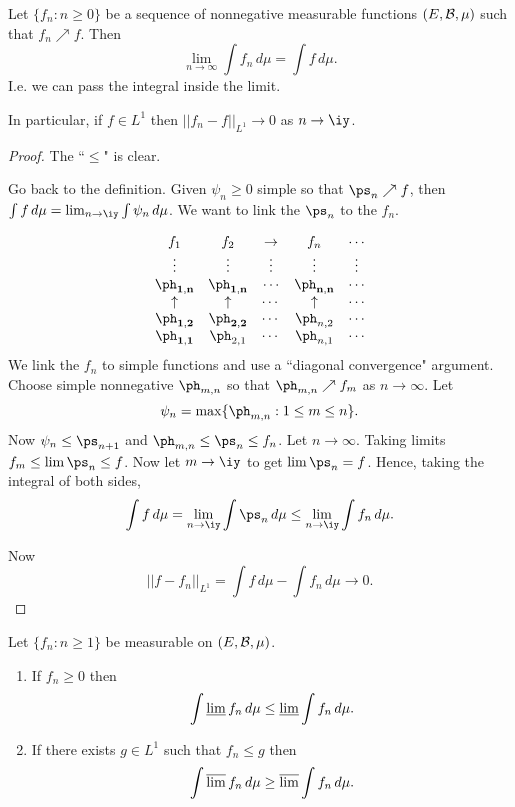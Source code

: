 \begin{thm}
Let $\{f_n:n\geq 0\}$ be a sequence of nonnegative measurable functions $(E,\cal B,\mu)$ such that $f_n\nearrow f$. Then
\[
\lim_{n\to \infty}\int f_n\,d\mu=\int f\,d\mu.
\] 
I.e. we can pass the integral inside the limit.

In particular, if $f\in L^1$ then $||f_n-f||_{L^1}\to 0$ as $n\to \iy$.
\end{thm}
\begin{proof}
The ``$\le$" is clear.

Go back to the definition. Given $\psi_n\ge 0$ simple so that $\ps_n\nearrow f$, then $\int f\,d\mu=\lim_{n\to\iy}\int \psi_n\,d\mu$. We want to link the $\ps_n$ to the $f_n$. 

\[
\begin{array}{ccccc}
f_{1} & f_{2} & \to & f_{n} & \cdots\\
\vdots & \vdots & \vdots & \vdots & \vdots\\
\mathbf{\ph_{1,n}} & \mathbf{\ph_{1,n}} & \mathbf{\cdots} & \mathbf{\ph_{n,n}} & \cdots\\
\uparrow & \uparrow & \cdots & \uparrow & \cdots\\
\mathbf{\ph_{1,2}} & \mathbf{\ph_{2,2}} & \cdots & \ph_{n,2} & \cdots\\
\mathbf{\ph_{1,1}} & \ph_{2,1} & \cdots & \ph_{n,1} & \cdots\end{array}
\]
We link the $f_n$ to simple functions and use a ``diagonal convergence" argument. Choose simple nonnegative $\ph_{m,n}$ so that $\ph_{m,n}\nearrow f_m$ as $n\to \infty$. Let
\[
\psi_n=\max\{\ph_{m,n}:1\leq m\leq n\}.
\]
Now $\psi_n\leq \ps_{n+1}$ and $\ph_{m,n}\leq \ps_n\leq f_n$. Let $n\to \infty$. Taking limits $f_m\leq \lim \ps_n \leq f$. Now let $m\to \iy$ to get $\lim\ps_n=f$. %
Hence, taking the integral of both sides,
\[
\int f\,d\mu=\lim_{n\to \iy} \int \ps_n\,d\mu\leq \lim_{n\to \iy} \int f_n\,d\mu.
\]

Now
\[
||f-f_n||_{L^1}=\int f\,d\mu -\int f_n\,d\mu\to 0.
\]
\end{proof}
\begin{thm}\label{fatou}
Let $\{f_n:n\geq 1\}$ be measurable on $(E,\cal B, \mu)$. 
\begin{enumerate}
\item
If $f_n\geq 0$ then 
\[
\int \varliminf f_n\, d\mu\leq \varliminf \int f_n\,d\mu.
\]
\item If there exists $g\in L^1$ such that $f_n\leq g$ then
\[
\int \varlimsup f_n\, d\mu\geq \varlimsup \int f_n\,d\mu.
\]
\end{enumerate}
\end{thm}

